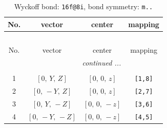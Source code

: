 \documentclass[fleqn,8pt]{jsarticle}
\begin{document}
\renewcommand{\arraystretch}{1.2}
\begin{longtable}{cccc}
\caption{Wyckoff bond: {\tt 16f@8i}, bond symmetry: {\tt m..}}
 \\
 \hline \hline
No. & vector & center & mapping \\ \hline \endfirsthead

\multicolumn{3}{l}{\tablename\ \thetable{}} \\
 \hline \hline
No. & vector & center & mapping \\ \hline \endhead

 \hline \hline
\multicolumn{3}{r}{\footnotesize\it continued ...} \\ \endfoot

 \hline \hline
\multicolumn{3}{r}{} \\ \endlastfoot

1 & $\left[ 0,\, Y,\, Z \right]$ & $\left[ 0,\, 0,\, z \right]$ & {\tt [1,8]} \\ \hline
2 & $\left[ 0,\, - Y,\, Z \right]$ & $\left[ 0,\, 0,\, z \right]$ & {\tt [2,7]} \\ \hline
3 & $\left[ 0,\, Y,\, - Z \right]$ & $\left[ 0,\, 0,\, - z \right]$ & {\tt [3,6]} \\ \hline
4 & $\left[ 0,\, - Y,\, - Z \right]$ & $\left[ 0,\, 0,\, - z \right]$ & {\tt [4,5]} \\
\end{longtable}
\renewcommand{\arraystretch}{1.2}
\end{document}
